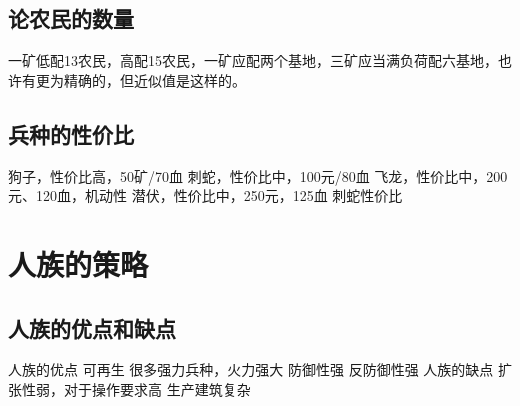 \documentclass{ctexart}
\begin{document}
\subsection{论农民的数量}
一矿低配13农民，高配15农民，一矿应配两个基地，三矿应当满负荷配六基地，也许有更为精确的，但近似值是这样的。
\subsection{兵种的性价比}
狗子，性价比高，50矿/70血
刺蛇，性价比中，100元/80血
飞龙，性价比中，200元、120血，机动性
潜伏，性价比中，250元，125血
刺蛇性价比
\section{人族的策略}
\subsection{人族的优点和缺点}
人族的优点
可再生
很多强力兵种，火力强大
防御性强
反防御性强
人族的缺点
扩张性弱，对于操作要求高
生产建筑复杂
\end{document}
